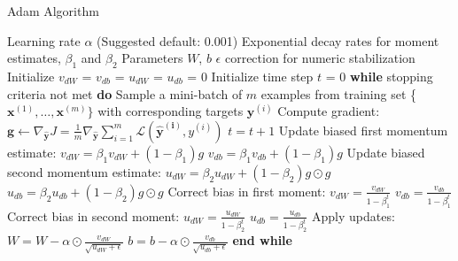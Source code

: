 \begin{algorithm}[!htbp]
	\caption{Adam Algorithm}
	\begin{algorithmic}
		\REQUIRE Learning rate $\alpha$ (Suggested default: 0.001)
		\REQUIRE Exponential decay rates for moment estimates, $\beta_{1}$ and $\beta_{2}$
		\REQUIRE Parameters $W$, $b$
		\REQUIRE $\epsilon$ correction for numeric stabilization 
		\STATE Initialize $v_{dW}$ = $v_{db}$ = $u_{dW}$ = $u_{db}$ = 0
		\STATE Initialize time step $t$ = 0
		\STATE \textbf{while} stopping criteria not met \textbf{do}
		\STATE \hspace{5mm} Sample a mini-batch of $m$ examples from training set \{$\boldsymbol{x}^{(1)}, \dots, \boldsymbol{x}^{(m)} \}$ with corresponding targets $\boldsymbol{y}^{(i)}$
		\STATE \hspace{5mm} Compute gradient: 
		$\boldsymbol{g} \leftarrow \nabla_{\boldsymbol{\hat{y}}}J = \frac{1}{m} \nabla_{\boldsymbol{\hat{y}}}\sum_{i = 1}^{m}\mathcal{L}(\boldsymbol{\hat{y}^{(i)}},y^{(i)})$
		\STATE \hspace{5mm} $t = t + 1$
		\STATE \hspace{5mm} Update biased first momentum estimate: 
		\STATE \hspace{10mm} $v_{dW} = \beta_{1} v_{dW} + (1-\beta_{1}) g$ 
		\STATE \hspace{10mm} $v_{db} = \beta_{1} v_{db} + (1-\beta_{1}) g$
		\STATE \hspace{5mm} Update biased second momentum estimate:
		\STATE \hspace{10mm} $u_{dW} = \beta_{2} u_{dW} + (1-\beta_{2}) g \odot g$
		\STATE \hspace{10mm} $u_{db} = \beta_{2} u_{db} + (1-\beta_{2}) g \odot g$
		\STATE \hspace{5mm} Correct bias in first moment:
		\STATE \hspace{10mm} $v_{dW} = \frac{v_{dW}}{1-\beta_{1}^{t}} $
		\STATE \hspace{10mm} $v_{db} = \frac{v_{db}}{1-\beta_{1}^{t}} $
		\STATE \hspace{5mm} Correct bias in second moment:
		\STATE \hspace{10mm} $u_{dW} = \frac{u_{dW}}{1-\beta_{2}^{t}} $
		\STATE \hspace{10mm} $u_{db} = \frac{u_{db}}{1-\beta_{2}^{t}} $
		\STATE \hspace{5mm} Apply updates:
		\STATE \hspace{10mm} $W = W - \alpha \odot \frac{v_{dW}}{\sqrt{u_{dW} + \epsilon}}$ 
		\STATE \hspace{10mm} $b = b - \alpha \odot \frac{v_{db}}{\sqrt{u_{db} + \epsilon}}$ 
		\STATE \textbf{end while}
	\end{algorithmic}
	\label{alg:adam}
\end{algorithm}

